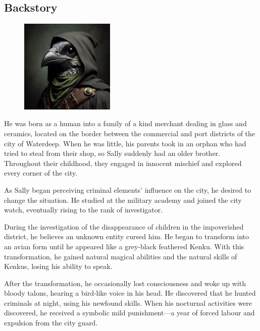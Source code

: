 \documentclass[10pt,onecolumn,twoside,openany,bg=full,layout=true]{dndbook}
\begin{document}
  \subsection{Backstory}\label{subsec:sally-backstory}
  \begin{figure}
    \begin{center}
      \includegraphics[width=0.4\textwidth]{img/sally}
      \vspace{1cm}
    \end{center}
  \end{figure}

He was born as a human into a family of a kind merchant dealing in glass and ceramics, located on the border between the
commercial and port districts of the city of Waterdeep.
When he was little, his parents took in an orphan who had tried to steal from their shop, so Sally suddenly had an
older brother.
Throughout their childhood, they engaged in innocent mischief and explored every corner of the city.

As Sally began perceiving criminal elements' influence on the city, he desired to change the situation.
He studied at the military academy and joined the city watch, eventually rising to the rank of investigator.

During the investigation of the disappearance of children in the impoverished district, he believes an unknown entity
cursed him.
He began to transform into an avian form until he appeared like a grey-black feathered Kenku.
With this transformation, he gained natural magical abilities and the natural skills of Kenkus, losing his ability
to speak.

After the transformation, he occasionally lost consciousness and woke up with bloody talons,
hearing a bird-like voice in his head.
He discovered that he hunted criminals at night, using his newfound skills.
When his nocturnal activities were discovered, he received a symbolic mild punishment—a year of forced labour and
expulsion from the city guard.
\end{document}
